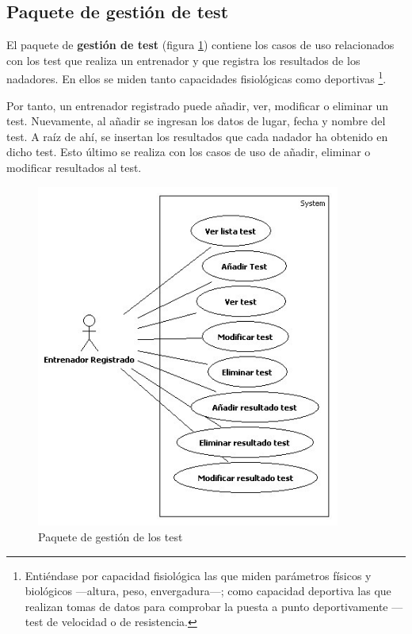 	
	
	\subsection{Paquete de gestión de test} %
		\label{sub:paquete_de_gestion_de_test}
		
		El paquete de {\bf gestión de test} (figura \ref{fig:analisis_gestion_test}) contiene los casos de uso relacionados con los test que realiza un entrenador y que registra los resultados de los nadadores. En ellos se miden tanto capacidades fisiológicas como deportivas \footnote{Entiéndase por capacidad fisiológica las que miden parámetros físicos y biológicos ---altura, peso, envergadura---; como capacidad deportiva las que realizan tomas de datos para comprobar la puesta a punto deportivamente ---test de velocidad o de resistencia.}.
		
		Por tanto, un entrenador registrado puede añadir, ver, modificar o eliminar un test. Nuevamente, al añadir se ingresan los datos de lugar, fecha y nombre del test. A raíz de ahí, se insertan los resultados que cada nadador ha obtenido en dicho test. Esto último se realiza con los casos de uso de añadir, eliminar o modificar resultados al test. 
		
		\begin{figure}[H]
		  \centering
		    \includegraphics[width=10cm]{./eps/casos_uso/gestion_test.eps}
		  \caption{Paquete de gestión de los test}
		  \label{fig:analisis_gestion_test}
		\end{figure}
	

